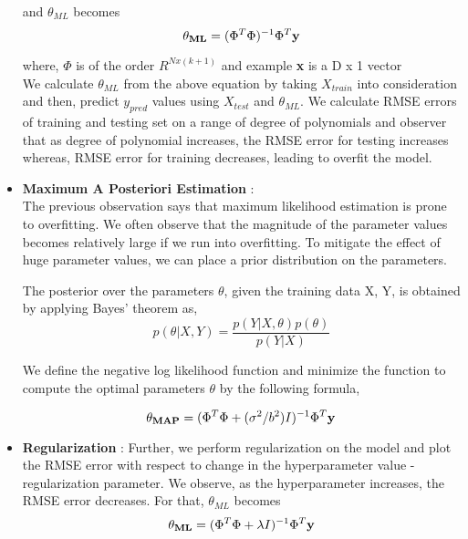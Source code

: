 \documentclass{article}
\begin{document}
\begin{itemize}
    and $\theta_{ML}$ becomes 
   \begin{equation*}
    \bold{\theta_{ML}} = (\Phi^{T}\Phi)^{-1}\Phi^{T}\textbf{y}
    \end{equation*} 
    
    where, $\Phi$ is of the order $R^{N x (k+1)}$ 
    and example \textbf{x} is a D x 1 vector \\
    We calculate $\theta_{ML}$ from the above equation by taking $X_{train}$ into consideration and then, predict $y_{pred}$ values using $X_{test}$ and $\theta_{ML}$.  We calculate RMSE errors of training and testing set on a range of degree of polynomials and observer that as degree of polynomial increases, the RMSE error for testing increases whereas, RMSE error for training decreases, leading to overfit the model. \\  
    
\item \textbf{Maximum A Posteriori Estimation} : \\ 
    The previous observation says that maximum likelihood estimation is prone to overfitting. We often observe that the magnitude of the parameter values becomes relatively large if we run into overfitting. To mitigate the effect of huge parameter values, we can place a prior
distribution on the parameters. 

The posterior over the parameters $\theta$, given the training data X, Y, is obtained by applying Bayes’ theorem as, 
\begin{equation*}
    p(\theta | X, Y) = \frac{p(Y | X, \theta) p(\theta)}{p(Y | X)}
\end{equation*} 

We define the negative log likelihood function and minimize the function to compute the optimal parameters $\theta$ by the following formula,

   \begin{equation*}
    \bold{\theta_{MAP}} = (\Phi^{T}\Phi + (\sigma^2/b^2) I)^{-1}\Phi^{T}\textbf{y}
    \end{equation*}
    
\item \textbf{Regularization} :
    Further, we perform regularization on the model and plot the RMSE error with respect to change in the hyperparameter value - regularization parameter. We observe, as the hyperparameter increases, the RMSE error decreases. For that, $\theta_{ML}$ becomes \\
     \begin{equation*}
    \bold{\theta_{ML}} = (\Phi^{T}\Phi + \lambda I)^{-1}\Phi^{T}\textbf{y}
    \end{equation*}
    

\end{itemize}
\end{document}
